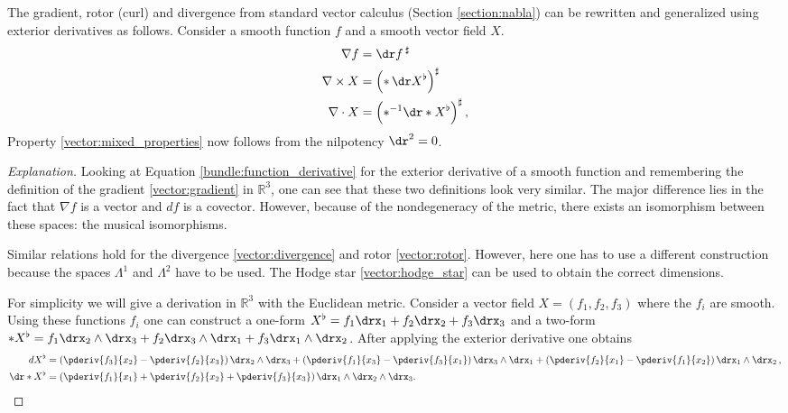     \begin{remark}\label{bundle:vector_calculus}
        The gradient, rotor (curl) and divergence from standard vector calculus (Section \ref{section:nabla}) can be rewritten and generalized using exterior derivatives as follows. Consider a smooth function $f$ and a smooth vector field $X$.
        \begin{align}
            \nabla f &= \dr f\,^\sharp\\
            \nabla\times X &= \left(\ast\,\dr X^\flat\right)^\sharp\\
            \nabla\cdot X &= \left(\ast^{-1}\dr\ast X^\flat\right)^\sharp,
        \end{align}
        Property \ref{vector:mixed_properties} now follows from the nilpotency $\dr^2=0$.
        \begin{mdframed}[roundcorner=10pt, linecolor=blue, linewidth=1pt]
            \begin{proof}[Explanation]
                Looking at Equation \eqref{bundle:function_derivative} for the exterior derivative of a smooth function and remembering the definition of the gradient \ref{vector:gradient} in $\mathbb{R}^3$, one can see that these two definitions look very similar. The major difference lies in the fact that $\nabla f$ is a vector and $df$ is a covector. However, because of the nondegeneracy of the metric, there exists an isomorphism between these spaces: the musical isomorphisms.

                Similar relations hold for the divergence \ref{vector:divergence} and rotor \ref{vector:rotor}. However, here one has to use a different construction because the spaces $\Lambda^1$ and $\Lambda^2$ have to be used. The Hodge star \ref{vector:hodge_star} can be used to obtain the correct dimensions.

                For simplicity we will give a derivation in $\mathbb{R}^3$ with the Euclidean metric. Consider a vector field $X = (f_1,f_2,f_3)$ where the $f_i$ are smooth. Using these functions $f_i$ one can construct a one-form $X^\flat = f_1\drx_1 + f_2\drx_2 + f_3\drx_3$ and a two-form $\ast X^\flat = f_1\drx_2\wedge\drx_3 + f_2\drx_3\wedge\drx_1 + f_3\drx_1\wedge\drx_2$. After applying the exterior derivative one obtains
                \begin{align}
                    dX^\flat &= \left(\pderiv{f_3}{x_2} - \pderiv{f_2}{x_3}\right)\drx_2\wedge\drx_3 + \left(\pderiv{f_1}{x_3} - \pderiv{f_3}{x_1}\right)\drx_3\wedge\drx_1 + \left(\pderiv{f_2}{x_1} - \pderiv{f_1}{x_2}\right)\drx_1\wedge\drx_2\,,\nonumber\\
                    \dr\ast X^\flat &= \left(\pderiv{f_1}{x_1} + \pderiv{f_2}{x_2} + \pderiv{f_3}{x_3}\right)\drx_1\wedge\drx_2\wedge\drx_3.\nonumber
                \end{align}
            \end{proof}
        \end{mdframed}
    \end{remark}


